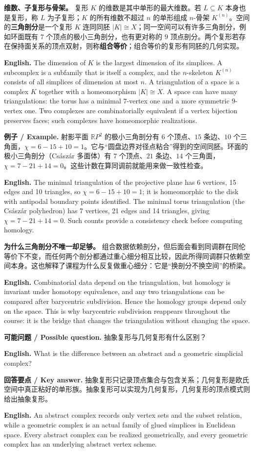 \documentclass[UTF8,11pt,a4paper]{ctexart}
\newcommand{\EN}[1]{\par\noindent\textbf{English.} #1\par}
\newcommand{\EX}[2]{\par\noindent\textbf{例子 / Example.} #1\par\EN{#2}}
\newcommand{\ASK}[4]{\par\noindent\textbf{可能问题 / Possible question.} #1\par\EN{#2}\noindent\textbf{回答要点 / Key answer.} #3\par\EN{#4}\medskip}
\begin{document}
\noindent\textbf{维数、子复形与骨架。} 复形 $K$ 的维数是其中单形的最大维数。若 $L\subseteq K$ 本身也是复形，称 $L$ 为子复形；$K$ 的所有维数不超过 $n$ 的单形组成 $n$-骨架 $K^{(n)}$。空间的\textbf{三角剖分}是一个复形 $K$ 连同同胚 $|K|\cong X$；同一空间可以有许多三角剖分，例如环面既有 $7$ 个顶点的极小三角剖分，也有更对称的 $9$ 顶点剖分。两个复形若存在保持面关系的顶点双射，则称\textbf{组合等价}；组合等价的复形有同胚的几何实现。
\EN{The dimension of $K$ is the largest dimension of its simplices. A subcomplex is a subfamily that is itself a complex, and the $n$-skeleton $K^{(n)}$ consists of all simplices of dimension at most $n$. A triangulation of a space is a complex $K$ together with a homeomorphism $|K|\cong X$. A space can have many triangulations: the torus has a minimal $7$-vertex one and a more symmetric $9$-vertex one. Two complexes are combinatorially equivalent if a vertex bijection preserves faces; such complexes have homeomorphic realizations.}

\EX{射影平面 $\mathbb R P^2$ 的极小三角剖分有 $6$ 个顶点、$15$ 条边、$10$ 个三角面，$\chi=6-15+10=1$。它与“圆盘边界对径点粘合”得到的空间同胚。环面的极小三角剖分（Császár 多面体）有 $7$ 个顶点、$21$ 条边、$14$ 个三角面，$\chi=7-21+14=0$。这些计数在算同调前就能用来做一致性检查。}{The minimal triangulation of the projective plane has 6 vertices, 15 edges and 10 triangles, so $\chi=6-15+10=1$; it is homeomorphic to the disk with antipodal boundary points identified. The minimal torus triangulation (the Császár polyhedron) has 7 vertices, 21 edges and 14 triangles, giving $\chi=7-21+14=0$. Such counts provide a consistency check before computing homology.}

\noindent\textbf{为什么三角剖分不唯一却足够。} 组合数据依赖剖分，但后面会看到同调群在同伦等价下不变，而任何两个剖分都通过重心细分相互比较，因此所得同调群只依赖空间本身。这也解释了课程为什么反复做重心细分：它是“换剖分不换空间”的桥梁。
\EN{Combinatorial data depend on the triangulation, but homology is invariant under homotopy equivalence, and any two triangulations can be compared after barycentric subdivision. Hence the homology groups depend only on the space. This is why barycentric subdivision reappears throughout the course: it is the bridge that changes the triangulation without changing the space.}

\ASK{抽象复形与几何复形有什么区别？}{What is the difference between an abstract and a geometric simplicial complex?}{抽象复形只记录顶点集合与包含关系；几何复形是欧氏空间中真正粘好的单形族。抽象复形可以实现为几何复形，几何复形的顶点模式则给出抽象复形。}{An abstract complex records only vertex sets and the subset relation, while a geometric complex is an actual family of glued simplices in Euclidean space. Every abstract complex can be realized geometrically, and every geometric complex has an underlying abstract vertex scheme.}
\end{document}
